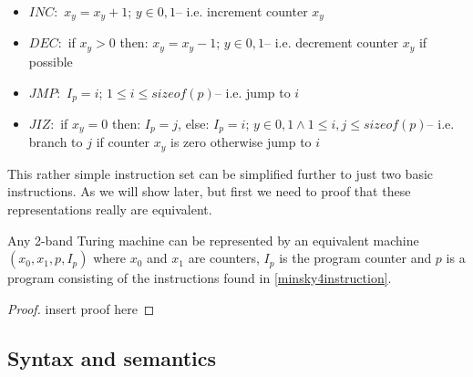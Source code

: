\begin{instructionset}
\label{minsky4instruction}
\begin{itemize}
\hfill
\item{$INC:$} $x_y = x_y + 1$; $ y\in{0,1}$\hfill\break -- i.e. increment counter $x_y$
\item{$DEC:$} if $x_y > 0$ then: $x_y = x_y - 1$; $ y\in{0,1}$\hfill\break -- i.e. decrement counter $x_y$ if possible
\item{$JMP:$} $I_p = i$; $ 1 \leq i \leq sizeof(p)$\hfill\break -- i.e. jump to $i$
\item{$JIZ:$} if $x_y=0$ then: $ I_p = j$, else: $I_p = i$; $y\in{0,1} \land 1 \leq i,j \leq sizeof(p)$\hfill\break -- i.e. branch to $j$ if counter $x_y$ is zero otherwise jump to $i$
\end{itemize}
\end{instructionset}
This rather simple instruction set can be simplified further to just two basic instructions. As we will show later, but first we need to proof that these representations really are equivalent.
\begin{lemma}
\label{lemma2btmtom4m}
Any 2-band Turing machine can be represented by an equivalent machine $(x_0, x_1, p, I_p)$ where $x_0$ and $x_1$ are counters, $I_p$ is the program counter and $p$ is a program consisting of the instructions found in \autoref{minsky4instruction}.
\begin{proof}
insert proof here
\end{proof}
\end{lemma}
\subsection{Syntax and semantics}

